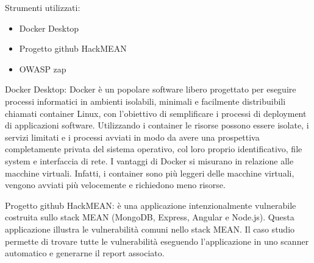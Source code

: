Strumenti utilizzati:
\begin{itemize}
    \item Docker Desktop
    \item Progetto  github HackMEAN
    \item OWASP zap
\end{itemize}
Docker Desktop: Docker è un popolare software libero progettato per eseguire processi informatici in ambienti isolabili, minimali e facilmente distribuibili chiamati container Linux, con l'obiettivo di semplificare i processi di deployment di applicazioni software. Utilizzando i container le risorse possono essere isolate, i servizi limitati e i processi avviati in modo da avere una prospettiva completamente privata del sistema operativo, col loro proprio identificativo, file system e interfaccia di rete. I vantaggi di Docker si misurano in relazione alle macchine virtuali. Infatti, i container sono più leggeri delle macchine virtuali, vengono avviati più velocemente e richiedono meno risorse. 

Progetto  github HackMEAN: è una applicazione intenzionalmente vulnerabile costruita sullo stack MEAN (MongoDB, Express, Angular e Node.js). Questa applicazione illustra le vulnerabilità comuni nello stack MEAN. 
Il caso studio permette di trovare tutte le vulnerabilità eseguendo l'applicazione in uno scanner automatico e generarne il report associato.

